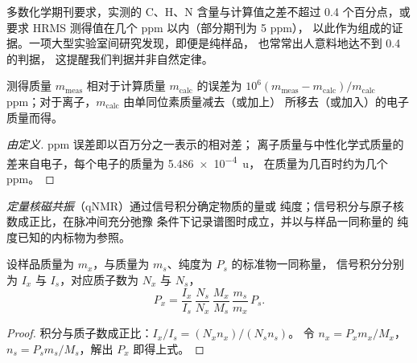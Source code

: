 多数化学期刊要求，实测的 C、H、N 含量与计算值之差不超过
0.4 个百分点，或要求 HRMS 测得值在几个 ppm 以内（部分期刊为 5 ppm），
以此作为组成的证据。一项大型实验室间研究发现，即便是纯样品，
也常常出人意料地达不到 0.4 的判据，
这提醒我们判据并非自然定律。

\begin{proposition}[HRMS 误差]\label{prop:b3:lab-techniques-3:ppm-error}
测得质量 $m_{\mathrm{meas}}$ 相对于计算质量 $m_{\mathrm{calc}}$ 的误差为
$10^6(m_{\mathrm{meas}} - m_{\mathrm{calc}})/m_{\mathrm{calc}}$ ppm；对于离子，$m_{\mathrm{calc}}$ 由单同位素质量减去（或加上）
所移去（或加入）的电子质量而得。
\end{proposition}

\begin{proof}[由定义]
ppm 误差即以百万分之一表示的相对差；
离子质量与中性化学式质量的差来自电子，每个电子的质量为 \qty{5.486e-4}{u}，
在质量为几百时约为几个 ppm。
\end{proof}

\begin{definition}[定量核磁共振]\label{def:b3:lab-techniques-3:qnmr}
\emph{定量核磁共振}（qNMR）通过信号积分确定物质的量或
纯度；信号积分与原子核数成正比，在脉冲间充分弛豫
条件下记录谱图时成立，并以与样品一同称量的
纯度已知的内标物为参照。
\end{definition}

\begin{proposition}[定量核磁共振纯度]\label{prop:b3:lab-techniques-3:qnmr}
设样品质量为 $m_x$，与质量为 $m_s$、纯度为 $P_s$ 的标准物一同称量，
信号积分分别为 $I_x$ 与 $I_s$，对应质子数为 $N_x$ 与 $N_s$，
\[
  P_x = \frac{I_x}{I_s}\,\frac{N_s}{N_x}\,\frac{M_x}{M_s}\,\frac{m_s}{m_x}\,P_s.
\]
\end{proposition}

\begin{proof}
积分与质子数成正比：$I_x/I_s = (N_xn_x)/(N_sn_s)$。
令 $n_x = P_xm_x/M_x$，$n_s = P_sm_s/M_s$，解出 $P_x$ 即得上式。
\end{proof}

